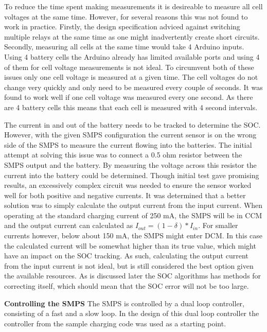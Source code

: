 \documentclass[a4paper]{article}
\begin{document}
To reduce the time spent making measurements it is desireable to measure all cell voltages
at the same time. However, for several reasons this was not found to work in practice. 
Firstly, the design specification adviced against switching multiple relays at the same
time as one might inadvertently create short circuits\cite{energyBrief}. Secondly, measuring
all cells at the same time would take 4 Arduino inputs. Using 4 battery cells the Arduino
already has limited available ports and using 4 of them for cell voltage measurements is not ideal. 
To circumvent both of these issues only one cell voltage is measured at a given time.
The cell voltages do not change very quickly and only need to be measured every couple 
of seconds. It was found to work well if one cell voltage was measured every one second.
As there are 4 battery cells this means that each cell is measured with 4 second intervals.

The current in and out of the battery needs to be tracked to determine the SOC.
However, with the given SMPS configuration the current sensor is on the wrong side of
the SMPS to measure the current flowing into the batteries. The initial attempt at solving
this issue was to connect a 0.5 ohm resistor between the SMPS output and the battery.
By measuring the voltage across this resistor the current into the battery could be
determined. Though initial test gave promising results, an excessively complex circuit
was needed to ensure the sensor worked well for both positive and negative currents.
It was determined that a better solution was to simply calculate the output current
from the input current. When operating at the standard charging current of 250 mA,
the SMPS will be in CCM and the output current can calculated as \( I_{out} = (1 - \delta)*I_{in} \).
For smaller currents however, below about 150 mA, the SMPS might enter DCM. In this case the calculated 
current will be somewhat higher than its true value, which might have an impact on the 
SOC tracking. As such, calculating the output current from the input current is not ideal, 
but is still considered the best option given the available resources. As is discussed 
later the SOC algorithms has methods for correcting itself, which should mean that the
SOC error will not be too large.

\textbf{Controlling the SMPS}
\vspace{10pt} 
\newline
The SMPS is controlled by a dual loop controller, consisting of a fast and a slow loop.
In the design of this dual loop controller the controller from the sample charging code
was used as a starting point\cite{chargeCode}. 
\end{document}
